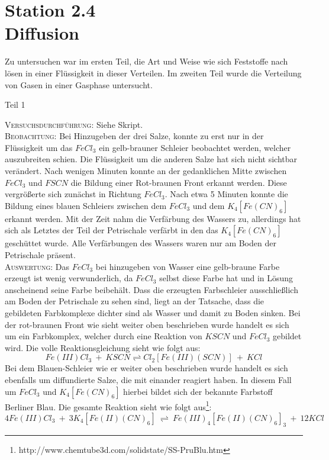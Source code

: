 \documentclass[11pt, a4paper]{article}
\begin{document}
\section*{Station 2.4\\Diffusion}

Zu untersuchen war im ersten Teil, die Art und Weise wie sich Feststoffe nach lösen in einer Flüssigkeit in dieser Verteilen.
Im zweiten Teil wurde die Verteilung von Gasen in einer Gasphase untersucht.

	\begin{center}
	Teil 1
	\end{center}


\textsc{Versuchsdurchführung:} Siehe Skript.\\

\textsc{Beobachtung:}\hspace{5mm} Bei Hinzugeben der drei Salze, konnte zu erst nur in der Flüssigkeit um das $FeCl_3$ ein gelb-brauner Schleier beobachtet werden, welcher auszubreiten schien. Die Flüssigkeit um die anderen Salze hat sich nicht sichtbar verändert. Nach wenigen Minuten konnte an der gedanklichen Mitte zwischen $FeCl_3$ und $FSCN$ die Bildung einer Rot-braunen Front erkannt werden. Diese vergrößerte sich zunächst in Richtung $FeCl_3$. Nach etwa 5 Minuten konnte die Bildung eines blauen Schleiers zwischen dem $FeCl_3$ und dem $K_4[Fe(CN)_6]$ erkannt werden. Mit der Zeit nahm die Verfärbung des Wassers zu, allerdings hat sich als Letztes der Teil der Petrischale verfärbt in den das $K_4[Fe(CN)_6]$ geschüttet wurde. Alle Verfärbungen des Wassers waren nur am Boden der Petrischale präsent.\\

\textsc{Auswertung:}\hspace{8mm} Das $FeCl_3$ bei hinzugeben von Wasser eine gelb-braune Farbe erzeugt ist wenig verwunderlich, da $FeCl_3$ selbst diese Farbe hat und in Lösung anscheinend seine Farbe beibehält. Dass die erzeugten Farbschleier ausschließlich am Boden der Petrischale zu sehen sind, liegt an der Tatsache, dass die gebildeten Farbkomplexe dichter sind als Wasser und damit zu Boden sinken. Bei der rot-braunen Front wie sieht weiter oben beschrieben wurde handelt es sich um ein Farbkomplex, welcher durch eine Reaktion von $KSCN$ und $FeCl_3$ gebildet wird. Die volle Reaktionsgleichung sieht wie folgt aus: 
$$Fe(III)Cl_3\ +\ KSCN \rightleftharpoons Cl_2\left[Fe(III)(SCN)\right]\ +\ KCl$$
Bei dem Blauen-Schleier wie er weiter oben beschrieben wurde handelt es sich ebenfalls um diffundierte Salze, die mit einander reagiert haben. In diesem Fall um $FeCl_3$ und $K_4[Fe(CN)_6]$ hierbei bildet sich der bekannte Farbstoff Berliner Blau. Die gesamte Reaktion sieht wie folgt aus\footnote{http://www.chemtube3d.com/solidstate/SS-PruBlu.htm}: $$4Fe(III)Cl_3\ +\ 3K_4\left[Fe(II)(CN)_6\right]\ \rightleftharpoons\ Fe(III)_4\left[Fe(II)(CN)_6\right]_3\ +\ 12KCl$$ 
\end{document}
